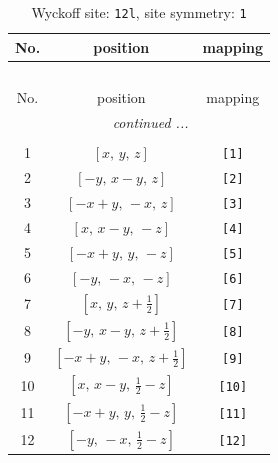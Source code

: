 \documentclass[fleqn,8pt]{jsarticle}
\begin{document}
\begin{longtable}{ccc}
\caption{Wyckoff site: {\tt 12l}, site symmetry: {\tt 1}}
 \\
 \hline \hline
No. & position & mapping \\ \hline \endfirsthead

\multicolumn{2}{l}{\tablename\ \thetable{}} \\
 \hline \hline
No. & position & mapping \\ \hline \endhead

 \hline \hline
\multicolumn{2}{r}{\footnotesize\it continued ...} \\ \endfoot

 \hline \hline
\multicolumn{2}{r}{} \\ \endlastfoot

1 & $\left[ x,\, y,\, z \right]$ & {\tt [1]} \\ \hline
2 & $\left[ - y,\, x - y,\, z \right]$ & {\tt [2]} \\ \hline
3 & $\left[ - x + y,\, - x,\, z \right]$ & {\tt [3]} \\ \hline
4 & $\left[ x,\, x - y,\, - z \right]$ & {\tt [4]} \\ \hline
5 & $\left[ - x + y,\, y,\, - z \right]$ & {\tt [5]} \\ \hline
6 & $\left[ - y,\, - x,\, - z \right]$ & {\tt [6]} \\ \hline
7 & $\left[ x,\, y,\, z + \frac{1}{2} \right]$ & {\tt [7]} \\ \hline
8 & $\left[ - y,\, x - y,\, z + \frac{1}{2} \right]$ & {\tt [8]} \\ \hline
9 & $\left[ - x + y,\, - x,\, z + \frac{1}{2} \right]$ & {\tt [9]} \\ \hline
10 & $\left[ x,\, x - y,\, \frac{1}{2} - z \right]$ & {\tt [10]} \\ \hline
11 & $\left[ - x + y,\, y,\, \frac{1}{2} - z \right]$ & {\tt [11]} \\ \hline
12 & $\left[ - y,\, - x,\, \frac{1}{2} - z \right]$ & {\tt [12]} \\
\end{longtable}
\end{document}
